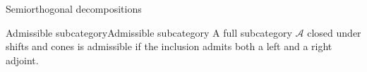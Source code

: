 



 Semiorthogonal decompositions

\begin{definition}{Admissible subcategory}{Admissible subcategory}
    A full subcategory $\mathcal{A}$ closed under shifts and cones is admissible if the inclusion admits both a left and a right adjoint.
\end{definition}

